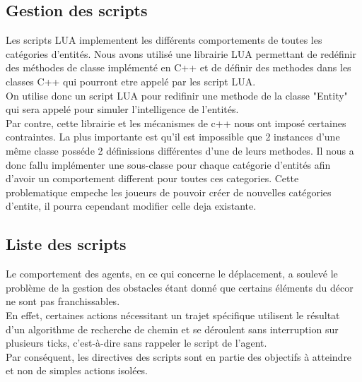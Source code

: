 \documentclass[a4paper]{memoir}
\begin{document}
			\subsection{Gestion des scripts}
				Les scripts LUA implementent les différents comportements de toutes les catégories d'entités. Nous avons utilisé une librairie LUA permettant de redéfinir des méthodes de classe implémenté en C++ et de définir des methodes dans les classes C++ qui pourront etre appelé par les script LUA.\\
				On utilise donc un script LUA pour redifinir une methode de la classe "Entity" qui sera appelé pour simuler l'intelligence de l'entités.\\
				Par contre, cette librairie et les mécanismes de c++ nous ont imposé certaines contraintes. La plus importante est qu'il est impossible que 2 instances d'une même classe posséde 2 définissions différentes d'une de leurs methodes. Il nous a donc fallu implémenter une sous-classe pour chaque catégorie d'entités afin d'avoir un comportement different pour toutes ces categories. Cette problematique empeche les joueurs de pouvoir créer de nouvelles catégories d'entite, il pourra cependant modifier celle deja existante.
				
			\subsection{Liste des scripts}
				Le comportement des agents, en ce qui concerne le déplacement, a soulevé le problème de la gestion des obstacles étant donné que certains éléments du décor ne sont pas franchissables.\\
				En effet, certaines actions nécessitant un trajet spécifique utilisent le résultat d'un algorithme de recherche de chemin et se déroulent sans interruption sur plusieurs ticks, c'est-à-dire sans rappeler le script de l'agent.\\
				Par conséquent, les directives des scripts sont en partie des objectifs à atteindre et non de simples actions isolées.
	
\end{document}

